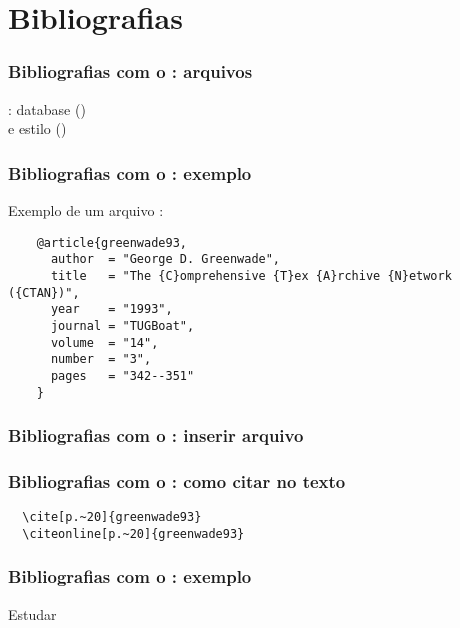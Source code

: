 \section{Bibliografias}

\begin{frame}
  \frametitle{Bibliografias com o : arquivos}
  \LARGE
  : database ()\\
  e estilo ()
\end{frame}

\begin{frame}[fragile]
  \frametitle{Bibliografias com o : exemplo}
  \LARGE
  Exemplo de um arquivo :
  \vspace{1em}

  \begin{verbatim}
    @article{greenwade93,
      author  = "George D. Greenwade",
      title   = "The {C}omprehensive {T}ex {A}rchive {N}etwork ({CTAN})",
      year    = "1993",
      journal = "TUGBoat",
      volume  = "14",
      number  = "3",
      pages   = "342--351"
    }
  \end{verbatim}
\end{frame}

\begin{frame}[fragile]
  \frametitle{Bibliografias com o : inserir arquivo }
  \LARGE
  \texttt{}
\end{frame}

\begin{frame}[fragile]
  \frametitle{Bibliografias com o : como citar no texto}
  \begin{verbatim}
  \cite[p.~20]{greenwade93}
  \citeonline[p.~20]{greenwade93}
  \end{verbatim}
\end{frame}

\begin{frame}
  \frametitle{Bibliografias com o : exemplo}
  \huge
  Estudar 
\end{frame}
